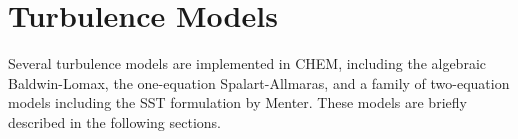 \section{Turbulence Models}

Several turbulence models are implemented in CHEM, including the
algebraic Baldwin-Lomax\cite{BL.78}, the one-equation
Spalart-Allmaras\cite{SA.92}, and a family of two-equation models
including the SST formulation by Menter\cite{Menter.92}.  These models are
briefly described in the following sections.

